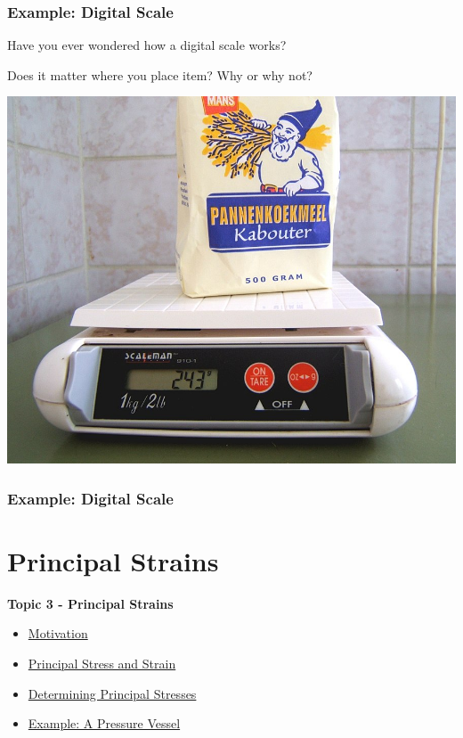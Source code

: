 \documentclass[fleqn]{beamer} %
\newcommand{\sectionIIItitle}{Principal Strains}
\newcommand{\sectionIIsubsectionIVtitle}{Example: Digital Scale}
\newcommand{\sectionIIIsubsectionItitle}{Motivation}
\newcommand{\sectionIIIsubsectionIItitle}{Principal Stress and Strain}
\newcommand{\sectionIIIsubsectionIIItitle}{Determining Principal Stresses}
\newcommand{\sectionIIIsubsectionIVtitle}{Example: A Pressure Vessel}
\begin{document}
			\begin{frame}
				\frametitle{\sectionIIsubsectionIVtitle}

				\begin{multicols}{2}
Have you ever wondered how a digital scale works? \vspcc

Does it matter where you place item? Why or why not?

\includegraphics[scale=.2]{images/digital_scale.jpg}
\end{multicols}

			\end{frame}

			\begin{frame}
				\frametitle{\sectionIIsubsectionIVtitle}


			\end{frame}
		
	\section{\sectionIIItitle}\label{sectionIII}

		\begin{frame}
			\large \textbf{Topic 3 - \sectionIIItitle} \vspace{3mm}\\

			\begin{itemize}
				\item \hyperlink{sectionIIIsubsectionI}{\sectionIIIsubsectionItitle} \vspc %
				\item \hyperlink{sectionIIIsubsectionII}{\sectionIIIsubsectionIItitle} \vspc %
				\item \hyperlink{sectionIIIsubsectionIII}{\sectionIIIsubsectionIIItitle} \vspc %
				\item \hyperlink{sectionIIIsubsectionIV}{\sectionIIIsubsectionIVtitle} \vspc %
			\end{itemize}

		\end{frame}
\end{document}
